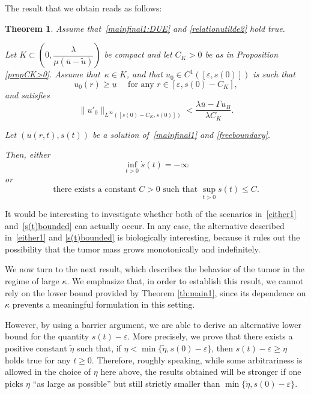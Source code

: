 \documentclass[12pt,a4paper,intlimits,sumlimits]{amsart}
\theoremstyle{definition}
\theoremstyle{plain}
\newtheorem{theorem}[definition]{Theorem}
\numberwithin{equation}{section}
\renewcommand{\le}{\leqslant}
\renewcommand{\ge}{\geqslant}
\begin{document}
The result that we obtain reads as follows:
\begin{theorem}\label{main3}
 Assume that~\eqref{mainfinal1:DUE} and \eqref{relationutilde2} hold true.

Let $K\subset \left(0, \dfrac{\lambda}{\mu(\overline u-\widetilde u)}\right)$ be compact and let $C_K>0$ be as in Proposition \ref{propCK>0}. Assume that~$\kappa\in K$, and that $u_0\in C^1([\varepsilon, s(0)])$ is such that
\begin{equation}\label{kolmjopjnhbgyugfcdrtesxzwea}
u_0(r)\ge\underline u\quad\mbox{ for any } r\in [\varepsilon, s(0)-C_K],
\end{equation}
and satisfies
\begin{equation}\label{okpijhugyftdruyjmlò,.àxqBHJKNGVCUhbjnaekfml}
\|u'_0\|_{L^\infty([s(0)-C_K, s(0)])}<\dfrac{\lambda\overline u-\Gamma u_B}{\lambda C_K}.
\end{equation}

Let $(u(r,t), s(t))$ be a solution of~\eqref{mainfinal1} and \eqref{freeboundary}.

Then,  either
\begin{equation}\label{either1}
\inf_{t>0} \dot{s}(t)=-\infty
\end{equation}
or
\begin{equation}\label{s(t)bounded}
\mbox{there exists a constant $C>0$ such that } \sup_{t>0}s(t)\le C.
\end{equation}
\end{theorem}

It would be interesting to investigate whether both of the scenarios in~\eqref{either1} and~\eqref{s(t)bounded} can actually occur. In any case, the alternative described in~\eqref{either1} and \eqref{s(t)bounded} is biologically interesting, because it rules out the possibility that the tumor mass grows monotonically and indefinitely.

We now turn to the next result, which describes the behavior of the tumor in the regime of large $\kappa$. We emphasize that, in order to establish this result, we cannot rely on the lower bound provided by Theorem \ref{th:main1}, since its dependence on $\kappa$ prevents a meaningful formulation in this setting.

However, by using a barrier argument, we are able to derive an alternative lower bound for the quantity $s(t)-\varepsilon$. 
More precisely, we prove that there exists a positive constant $\widetilde \eta$ such that, if $\eta<\min\{\widetilde \eta,s(0)-\varepsilon\}$, then $s(t)-\varepsilon\ge \eta$ holds true for any $t\ge 0$.
Therefore, roughly
speaking, while some arbitrariness is allowed in the choice of $\eta$ here above, the results obtained
will be stronger if one picks $\eta$ “as large as possible” but still strictly smaller than $\min\{\widetilde \eta,s(0)-\varepsilon\}$.
\end{document}
